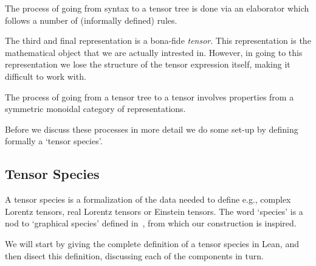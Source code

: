 \documentclass[a4paper, 11pt]{article}
\begin{document}
The process of going from syntax to a tensor tree is done via an elaborator 
which follows a number of (informally defined) rules.

The third and final representation is a bona-fide \emph{tensor}. This representation 
is the mathematical object that we are actually intrested in. However, in going to this representation
we lose the structure of the tensor expression itself, making it difficult to work with. 

The process of going from a tensor tree to a tensor involves properties from a symmetric monoidal 
category of representations. 

Before we discuss these processes in more detail we do some set-up by defining formally a 
`tensor species'. 

\subsection{Tensor Species}

A tensor species is a formalization of the data needed to define e.g., complex Lorentz tensors, 
real Lorentz tensors or Einstein tensors. The word `species' is a nod to `graphical species'
defined in~\cite{JOYAL2011105,raynor2021graphical}, from which our construction is inspired.

We will start by giving the complete definition of a tensor species in Lean, and then 
disect this definition, discussing each of the components in turn. 
\end{document}
